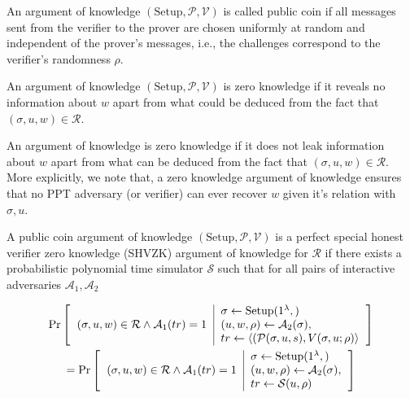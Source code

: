 \begin{defn}
    An argument of knowledge  $(\text{Setup}, \mathcal{P}, \mathcal{V})$ is called public coin if all messages sent from the verifier to the prover are chosen uniformly at random and independent of the prover's messages, i.e., the challenges correspond to the verifier's randomness $\rho$.
\end{defn}

\begin{defn}
    An argument of knowledge $(\text{Setup}, \mathcal{P}, \mathcal{V})$ is zero knowledge if it reveals no information about $w$ apart from what could be deduced from the fact that $(\sigma, u, w) \in \mathcal{R}$.
\end{defn}

An argument of knowledge is zero knowledge if it does not leak information about $w$ apart from what can be deduced from the fact that $(\sigma, u, w) \in \mathcal{R}$. More explicitly, we note that, a zero knowledge argument of knowledge ensures that no \textsf{PPT} adversary (or verifier) can ever recover $w$ given it's relation with $\sigma, u$.

\begin{defn}
    A public coin argument of knowledge $(\text{Setup}, \mathcal{P}, \mathcal{V})$ is a perfect special honest verifier zero knowledge (SHVZK) argument of knowledge for $\mathcal{R}$ if there exists a probabilistic polynomial time simulator $\mathcal{S}$ such that for all pairs of interactive adversaries $\mathcal{A}_1 , \mathcal{A}_2$
    
    \begin{multline*}
    \Pr
    \left[
    \begin{tabular}{c | l}
        \multirow{3}{*}{$(\sigma, u, w) \in \mathcal{R} \wedge \mathcal{A}_1(tr) = 1$}
         & $\sigma \leftarrow \text{Setup}(1^{\lambda},)$
         \\
         & 
         $(u, w, \rho) \leftarrow \mathcal{A}_2(\sigma),$
         \\
         & $tr \leftarrow \langle (\mathcal{P}(\sigma, u, s), V(\sigma, u; \rho) \rangle$
    \end{tabular}
    \right]
    \\
    =\Pr
    \left[
    \begin{tabular}{c | l}
        \multirow{3}{*}{$(\sigma, u, w) \in \mathcal{R} \wedge \mathcal{A}_1(tr) = 1$}
         & $\sigma \leftarrow \text{Setup}(1^{\lambda},)$
         \\
         & 
         $(u, w, \rho) \leftarrow \mathcal{A}_2(\sigma),$
         \\
         & $tr \leftarrow \mathcal{S}(u, \rho)$
    \end{tabular}
    \right]
    \end{multline*}

\end{defn}

